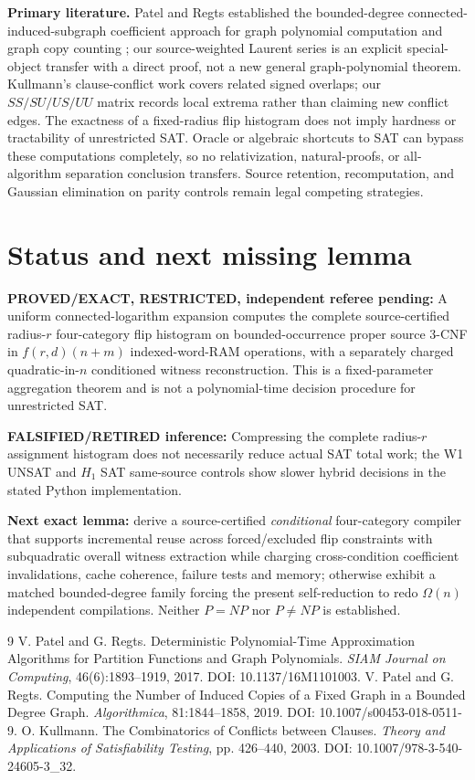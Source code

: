 \documentclass[11pt]{article}
\begin{document}
\noindent\textbf{Primary literature.} Patel and Regts established the bounded-degree connected-induced-subgraph coefficient approach for graph polynomial computation and graph copy counting \cite{PatelRegts2017,PatelRegts2019}; our source-weighted Laurent series is an explicit special-object transfer with a direct proof, not a new general graph-polynomial theorem. Kullmann's clause-conflict work \cite{Kullmann2003} covers related signed overlaps; our $SS/SU/US/UU$ matrix records local extrema rather than claiming new conflict edges. The exactness of a fixed-radius flip histogram does not imply hardness or tractability of unrestricted SAT. Oracle or algebraic shortcuts to SAT can bypass these computations completely, so no relativization, natural-proofs, or all-algorithm separation conclusion transfers. Source retention, recomputation, and Gaussian elimination on parity controls remain legal competing strategies.

\section{Status and next missing lemma}
\noindent\textbf{PROVED/EXACT, RESTRICTED, independent referee pending:} A uniform connected-logarithm expansion computes the complete source-certified radius-$r$ four-category flip histogram on bounded-occurrence proper source 3-CNF in $f(r,d)(n+m)$ indexed-word-RAM operations, with a separately charged quadratic-in-$n$ conditioned witness reconstruction. This is a fixed-parameter aggregation theorem and is not a polynomial-time decision procedure for unrestricted SAT.

\noindent\textbf{FALSIFIED/RETIRED inference:} Compressing the complete radius-$r$ assignment histogram does not necessarily reduce actual SAT total work; the W1 UNSAT and $H_1$ SAT same-source controls show slower hybrid decisions in the stated Python implementation.

\noindent\textbf{Next exact lemma:} derive a source-certified \emph{conditional} four-category compiler that supports incremental reuse across forced/excluded flip constraints with subquadratic overall witness extraction while charging cross-condition coefficient invalidations, cache coherence, failure tests and memory; otherwise exhibit a matched bounded-degree family forcing the present self-reduction to redo $\Omega(n)$ independent compilations. Neither $P=NP$ nor $P\ne NP$ is established.
\begin{thebibliography}{9}
 V. Patel and G. Regts. Deterministic Polynomial-Time Approximation Algorithms for Partition Functions and Graph Polynomials. \emph{SIAM Journal on Computing}, 46(6):1893--1919, 2017. DOI: 10.1137/16M1101003.
 V. Patel and G. Regts. Computing the Number of Induced Copies of a Fixed Graph in a Bounded Degree Graph. \emph{Algorithmica}, 81:1844--1858, 2019. DOI: 10.1007/s00453-018-0511-9.
 O. Kullmann. The Combinatorics of Conflicts between Clauses. \emph{Theory and Applications of Satisfiability Testing}, pp. 426--440, 2003. DOI: 10.1007/978-3-540-24605-3\_32.
\end{thebibliography}
\end{document}
